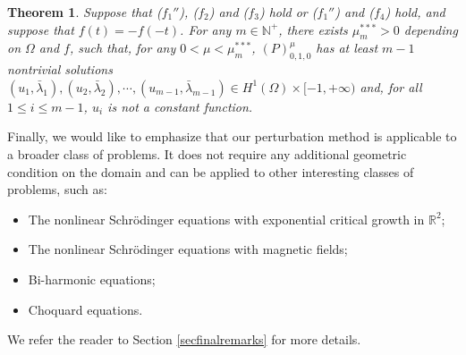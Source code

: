 \documentclass[11pt]{amsart}
\newtheorem{theorem}{Theorem}[section]
\newcommand{\red}[1]{\textcolor{red}{#1}}
\newcommand{\blue}[1]{\textcolor{blue}{#1}}
\numberwithin{equation}{section}
\begin{document}

\begin{theorem}\label{th4.2}
	Suppose that  ($f_1''$), ($f_2$) and ($f_3$) hold or ($f_1''$) and ($f_4$) hold, and suppose that $f(t)=-f(-t)$. For any $m \in \mathbb{N}^+$, there exists $\mu_{m}^{***}> 0$ depending on $\Omega$ and $f$, such that, for any $0 < \mu < \mu_{m}^{***}$,  $(P)^{\mu}_{0,1,0}$  has at least $m-1$ nontrivial solutions $(u_1,\bar{\lambda}_1), (u_2,\bar{\lambda}_2),\cdots,(u_{m-1},\bar{\lambda}_{m-1}) \in H^{1}(\Omega)\times[-1,+\infty)$ and, for all $1\leq i\leq m-1$, $u_i$ is not a constant function.
\end{theorem}



Finally, we would like to emphasize that our perturbation method is applicable to a broader class of problems. It does not require any additional geometric condition on the domain and can be applied to other interesting classes of problems, such as:
\begin{itemize}
	\item[(a)] The nonlinear Schr\"{o}dinger equations with exponential critical growth in $\mathbb{R}^2$;
	\item[(b)] The nonlinear Schr\"{o}dinger equations with magnetic fields;
	\item[(c)] Bi-harmonic equations;
	\item[(d)] Choquard equations.
\end{itemize}
We refer the reader to  Section \ref{secfinalremarks} for more details.
\end{document}
